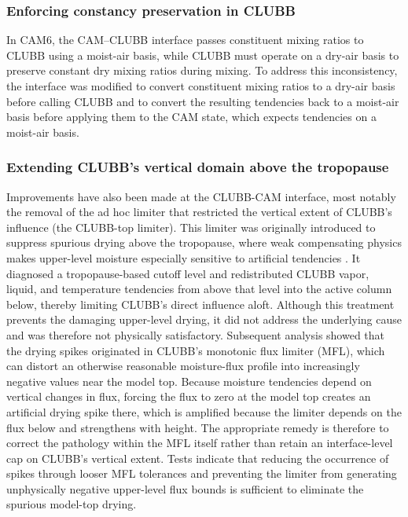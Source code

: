 \documentclass[draft]{agujournal2019}
\begin{document}
\subsubsection{Enforcing constancy preservation in CLUBB}

In CAM6, the CAM–CLUBB interface passes constituent mixing ratios to CLUBB using a moist-air basis, while CLUBB must operate on a dry-air basis to preserve constant dry mixing ratios during mixing. To address this inconsistency, the interface was modified to convert constituent mixing ratios to a dry-air basis before calling CLUBB and to convert the resulting tendencies back to a moist-air basis before applying them to the CAM state, which expects tendencies on a moist-air basis.

\subsubsection{Extending CLUBB’s vertical domain above the tropopause}

Improvements have also been made at the CLUBB-CAM interface, most notably the removal of the ad hoc limiter that restricted the vertical extent of CLUBB’s influence (the CLUBB-top limiter). This limiter was originally introduced to suppress spurious drying above the tropopause, where weak compensating physics makes upper-level moisture especially sensitive to artificial tendencies \cite{bogenschutz_et_al_2013a}. It diagnosed a tropopause-based cutoff level and redistributed CLUBB vapor, liquid, and temperature tendencies from above that level into the active column below, thereby limiting CLUBB’s direct influence aloft. Although this treatment prevents the damaging upper-level drying, it did not address the underlying cause and was therefore not physically satisfactory. Subsequent analysis showed that the drying spikes originated in CLUBB’s monotonic flux limiter (MFL), which can distort an otherwise reasonable moisture-flux profile into increasingly negative values near the model top. Because moisture tendencies depend on vertical changes in flux, forcing the flux to zero at the model top creates an artificial drying spike there, which is amplified because the limiter depends on the flux below and strengthens with height. The appropriate remedy is therefore to correct the pathology within the MFL itself rather than retain an interface-level cap on CLUBB’s vertical extent. Tests indicate that reducing the occurrence of spikes through looser MFL tolerances and preventing the limiter from generating unphysically negative upper-level flux bounds is sufficient to eliminate the spurious model-top drying.
\end{document}
